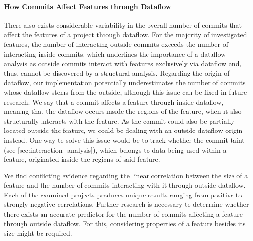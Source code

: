 \paragraph{How Commits Affect Features through Dataflow}
There also exists considerable variability in the overall number of commits that affect the features of a project through dataflow.
For the majority of investigated features, the number of interacting outside commits exceeds the number of interacting inside commits, which underlines the importance of a dataflow analysis as outside commits interact with features exclusively via dataflow and, thus, cannot be discovered by a structural analysis.
Regarding the origin of dataflow, our implementation potentially underestimates the number of commits whose dataflow stems from the outside, although this issue can be fixed in future research.
We say that a commit affects a feature through inside dataflow, meaning that the dataflow occurs inside the regions of the feature, when it also structurally interacts with the feature.
As the commit could also be partially located outside the feature, we could be dealing with an outside dataflow origin instead.
One way to solve this issue would be to track whether the commit taint (see \autoref{sec:interaction_analysis}), which belongs to data being used within a feature, originated inside the regions of said feature. 

We find conflicting evidence regarding the linear correlation between the size of a feature and the number of commits interacting with it through outside dataflow.
Each of the examined projects produces unique results ranging from positive to strongly negative correlations.
Further research is necessary to determine whether there exists an accurate predictor for the number of commits affecting a feature through outside dataflow.
For this, considering properties of a feature besides its size might be required.

